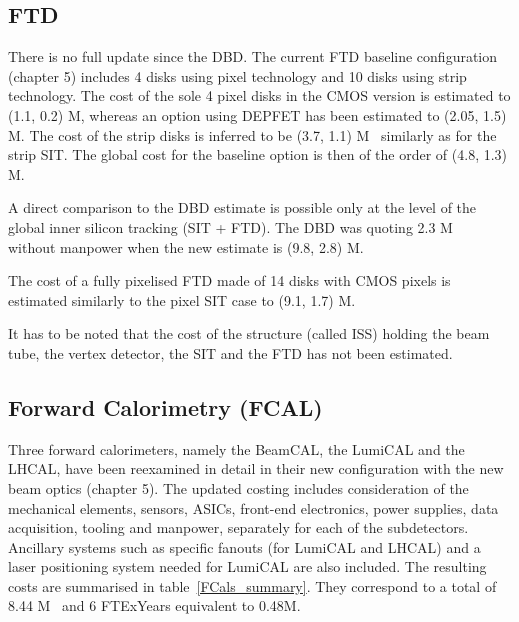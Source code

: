 \subsection{FTD}
There is no full update since the DBD. The current FTD baseline configuration (chapter 5) includes 4 disks using pixel technology and 10 disks using strip technology. The cost of the sole 4 pixel disks in the CMOS version is estimated to (1.1, 0.2) M\texteuro, whereas an option using DEPFET has been estimated to (2.05, 1.5) M\texteuro.
The cost of the strip disks is inferred to be (3.7, 1.1) M\texteuro~ similarly as for the strip SIT. The global cost for the baseline option is then of the order of (4.8, 1.3) M\texteuro. 

A direct comparison to the DBD estimate is possible only at the level of the global inner silicon tracking (SIT + FTD). The DBD was quoting 2.3 M\texteuro~ without manpower when the new estimate is (9.8, 2.8) M\texteuro.

The cost of a fully pixelised FTD made of 14 disks with CMOS pixels is estimated similarly to the pixel SIT case to (9.1, 1.7) M\texteuro.


It has to be noted that the cost of the structure (called ISS) holding the beam tube, the vertex detector, the SIT and the FTD has not been estimated.

\subsection{Forward Calorimetry (FCAL)}

Three forward calorimeters, namely the BeamCAL, the LumiCAL and the LHCAL, have been reexamined in detail in their new configuration with the new beam optics (chapter 5). The updated costing includes consideration of the mechanical elements, sensors, ASICs, front-end electronics, power supplies, data acquisition, tooling and manpower, separately for each of the subdetectors. Ancillary systems such as specific fanouts (for LumiCAL and LHCAL) and a laser positioning system needed for LumiCAL are also included. The resulting costs are summarised in table~\ref{FCals_summary}. They correspond to a total of 8.44 M\texteuro~ and 6 FTExYears equivalent to 0.48M\texteuro.

